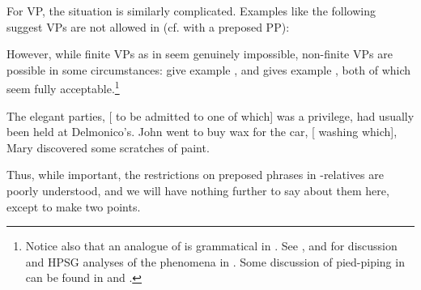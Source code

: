 \documentclass[output=paper,biblatex,babelshorthands,newtxmath,draftmode,colorlinks,citecolor=brown]{langscibook}
\begin{document}
For VP, the situation is similarly complicated. Examples like the following suggest VPs
are not allowed in  (cf.  with a preposed PP):
\begin{exe}\ex\begin{xlist}
    \label{x:rc-26}
    \label{x:rc-27}
    \label{x:rc-281}
    \label{x:rc-291}
  \end{xlist}
\end{exe}
However, while finite VPs as in  seem genuinely impossible, non-finite VPs
are possible in some circumstances: \citet[311]{NanniStillings78} give example
, and \citet[399]{Ishihara84} gives example , both of which
seem fully acceptable.\footnote{Notice also that an analogue of  is
  grammatical in . See ,  and 
  for discussion and HPSG analyses of the phenomena in . Some discussion of
  pied-piping in  can be found in  and .}
\begin{exe}\ex\begin{xlist}
    \ex\label{x:rc-236} The elegant parties, [ to be admitted to one of which] was a privilege,
    had usually been held at Delmonico's. 
    \ex\label{x:rc-237} John went to buy wax for the car, [ washing which], Mary
    discovered some scratches of paint. 
  \end{xlist}
\end{exe}

\noindent
Thus, while important, the restrictions on preposed phrases in -relatives are
poorly understood, and we will have nothing further to say about them here, except to make
two points.
\end{document}
